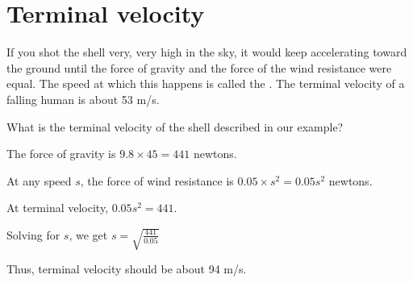\section{Terminal velocity}

If you shot the shell very, very high in the sky, it would keep accelerating 
toward the ground until the force of gravity and the force of the wind resistance were equal.
The speed at which this happens is called the .  The terminal velocity of a
falling human is about 53 m/s.

\begin{Exercise}[title={Terminal velocity}, label=terminal_velocity]
    What is the terminal velocity of the shell described in our example?
\end{Exercise}
\begin{Answer}[ref=terminal_velocity]
The force of gravity is $9.8 \times 45 = 441$ newtons.

At any speed $s$, the force of wind resistance is $0.05 \times s^2 = 0.05 s^2$ newtons.

At terminal velocity, $0.05 s^2 = 441$. 

Solving for $s$, we get $s = \sqrt{\frac{441}{0.05}}$

Thus, terminal velocity should be about 94 m/s.

\end{Answer}
